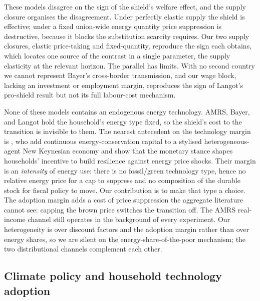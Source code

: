 These models disagree on the sign of the shield's welfare effect, and the supply
closure organises the disagreement. Under perfectly elastic supply \citep{langot2026tariff} the
shield is effective; under a fixed union-wide energy quantity \citep{bayer2026hank}
price suppression is destructive, because it blocks the substitution scarcity
requires. Our two supply closures, elastic price-taking and fixed-quantity,
reproduce the sign each obtains, which locates one source of the contrast in a
single parameter, the supply elasticity at the relevant horizon. The parallel
has limits. With no second country we cannot represent Bayer's cross-border
transmission, and our wage block, lacking an investment or employment margin,
reproduces the sign of Langot's pro-shield result but not its full labour-cost
mechanism.

None of these models contains an endogenous energy technology. AMRS, Bayer,
and Langot hold the household's energy type fixed, so the shield's cost to the
transition is invisible to them. The nearest antecedent on the technology margin is
\citet{AudzeiSutoris2026}, who add continuous energy-conservation capital to a
stylised heterogeneous-agent New Keynesian economy and show that the monetary
stance shapes households' incentive to build resilience against energy price
shocks. Their margin is an \emph{intensity} of energy use: there is no fossil/green
technology type, hence no relative energy price for a cap to suppress and no
composition of the durable stock for fiscal policy to move. Our contribution is to
make that type a choice.
The adoption margin adds a cost of price suppression the aggregate literature
cannot see: capping the brown price switches the transition off. The AMRS
real-income channel still operates in the background of every experiment. Our heterogeneity is over discount factors and the adoption margin
rather than over energy shares, so we are silent on the energy-share-of-the-poor
mechanism; the two distributional channels complement each other.

\subsection{Climate policy and household technology adoption}
\label{sec:lit_climate}


